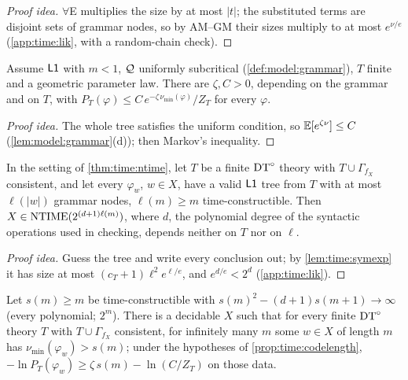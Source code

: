\begin{proof}[Proof idea]
$\forall$E multiplies the size by at most $|t|$; the substituted terms are disjoint sets of grammar nodes, so by AM--GM their sizes multiply to at most $e^{\nu/e}$ (\cref{app:time:lik}, with a random-chain check).
\end{proof}

\begin{proposition}\label{prop:time:codelength}
Assume $\mathord{\mathsf{L1}}$ with $m<1$, $\mathcal{Q}$ uniformly subcritical (\cref{def:model:grammar}), $T$ finite and a geometric parameter law. There are $\zeta,C>0$, depending on the grammar and on $T$, with $P_T(\varphi)\le C\,e^{-\zeta\,\nu_{\min}(\varphi)}/Z_T$ for every $\varphi$.
\end{proposition}

\begin{proof}[Proof idea]
The whole tree satisfies the uniform condition, so $\mathbb{E}[e^{\zeta\nu}]\le C$ (\cref{lem:model:grammar}(d)); then Markov's inequality.
\end{proof}

\begin{theorem}\label{thm:time:log}
In the setting of \cref{thm:time:ntime}, let $T$ be a finite $\mathrm{DT}^{\circ}$ theory with $T\cup\Gamma_{f_X}$ consistent, and let every $\varphi_w$, $w\in X$, have a valid $\mathord{\mathsf{L1}}$ tree from $T$ with at most $\ell(|w|)$ grammar nodes, $\ell(m)\ge m$ time-constructible. Then $X\in\mathrm{NTIME}(2^{(d+1)\ell(m)})$, where $d$, the polynomial degree of the syntactic operations used in checking, depends neither on $T$ nor on $\ell$.
\end{theorem}

\begin{proof}[Proof idea]
Guess the tree and write every conclusion out; by \cref{lem:time:symexp} it has size at most $(c_T+1)\ell^2e^{\ell/e}$, and $e^{d/e}<2^d$ (\cref{app:time:lik}).
\end{proof}

\begin{corollary}\label{cor:time:log}
Let $s(m)\ge m$ be time-constructible with $s(m)^2-(d+1)s(m+1)\to\infty$ (every polynomial; $2^m$). There is a decidable $X$ such that for every finite $\mathrm{DT}^{\circ}$ theory $T$ with $T\cup\Gamma_{f_X}$ consistent, for infinitely many $m$ some $w\in X$ of length $m$ has $\nu_{\min}(\varphi_w)>s(m)$; under the hypotheses of \cref{prop:time:codelength}, $-\ln P_T(\varphi_w)\ge\zeta\,s(m)-\ln(C/Z_T)$ on those data.
\end{corollary}

